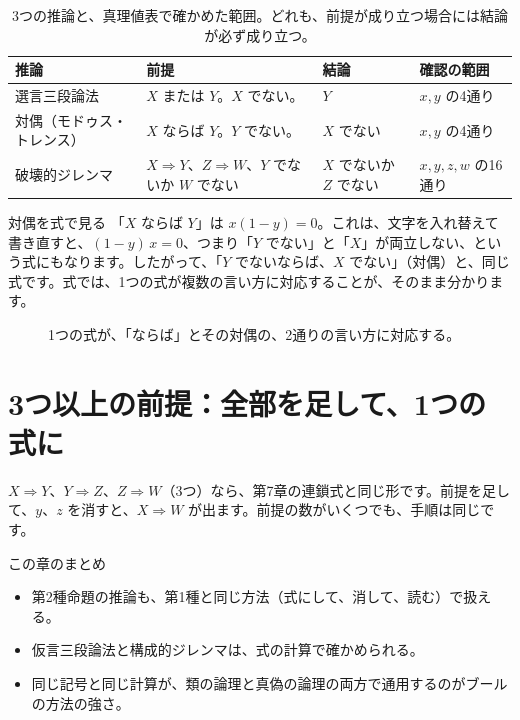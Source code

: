 \documentclass[a4paper,11pt,openany]{ltjsbook}
\newcommand{\nx}[1]{\overline{#1}}
\begin{document}
\begin{table}[htbp]
\centering
\small
\begin{tabular}{p{2.8cm}p{4.6cm}p{3cm}p{2.4cm}}
\toprule
推論 & 前提 & 結論 & 確認の範囲\\
\midrule
選言三段論法 & $X$ または $Y$。$X$ でない。 & $Y$ & $x,y$ の4通り\\
対偶（モドゥス・トレンス） & $X$ ならば $Y$。$Y$ でない。 & $X$ でない & $x,y$ の4通り\\
破壊的ジレンマ & $X\Rightarrow Y$、$Z\Rightarrow W$、$Y$ でないか $W$ でない & $X$ でないか $Z$ でない & $x,y,z,w$ の16通り\\
\bottomrule
\end{tabular}
\caption{3つの推論と、真理値表で確かめた範囲。どれも、前提が成り立つ場合には結論が必ず成り立つ。}
\end{table}

\begin{examplebox}{対偶を式で見る}
「$X$ ならば $Y$」は $x(1-y)=0$。これは、文字を入れ替えて書き直すと、$(1-y)\,x=0$、つまり「$Y$ でない」と「$X$」が両立しない、という式にもなります。したがって、「$Y$ でないならば、$X$ でない」（対偶）と、同じ式です。式では、1つの式が複数の言い方に対応することが、そのまま分かります。
\end{examplebox}

\begin{figure}[htbp]
\centering
{}
\caption{1つの式が、「ならば」とその対偶の、2通りの言い方に対応する。}
\end{figure}

\section{3つ以上の前提：全部を足して、1つの式に}

$X\Rightarrow Y$、$Y\Rightarrow Z$、$Z\Rightarrow W$（3つ）なら、第7章の連鎖式と同じ形です。前提を足して、$y$、$z$ を消すと、$X\Rightarrow W$ が出ます。前提の数がいくつでも、手順は同じです。

\begin{pointbox}{この章のまとめ}
\begin{itemize}[leftmargin=*]
\item 第2種命題の推論も、第1種と同じ方法（式にして、消して、読む）で扱える。
\item 仮言三段論法と構成的ジレンマは、式の計算で確かめられる。
\item 同じ記号と同じ計算が、類の論理と真偽の論理の両方で通用するのがブールの方法の強さ。
\end{itemize}
\end{pointbox}
\end{document}
